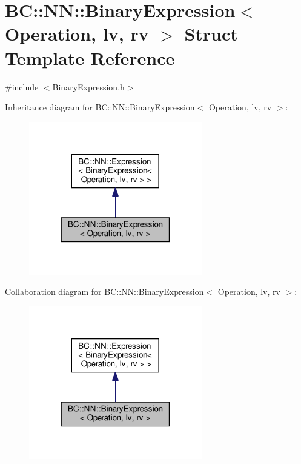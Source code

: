 \hypertarget{structBC_1_1NN_1_1BinaryExpression}{}\section{BC\+:\+:NN\+:\+:Binary\+Expression$<$ Operation, lv, rv $>$ Struct Template Reference}
\label{structBC_1_1NN_1_1BinaryExpression}


{\ttfamily \#include $<$Binary\+Expression.\+h$>$}



Inheritance diagram for BC\+:\+:NN\+:\+:Binary\+Expression$<$ Operation, lv, rv $>$\+:
\nopagebreak
\begin{figure}[H]
\begin{center}
\leavevmode
\includegraphics[width=214pt]{structBC_1_1NN_1_1BinaryExpression__inherit__graph}
\end{center}
\end{figure}


Collaboration diagram for BC\+:\+:NN\+:\+:Binary\+Expression$<$ Operation, lv, rv $>$\+:
\nopagebreak
\begin{figure}[H]
\begin{center}
\leavevmode
\includegraphics[width=214pt]{structBC_1_1NN_1_1BinaryExpression__coll__graph}
\end{center}
\end{figure}
